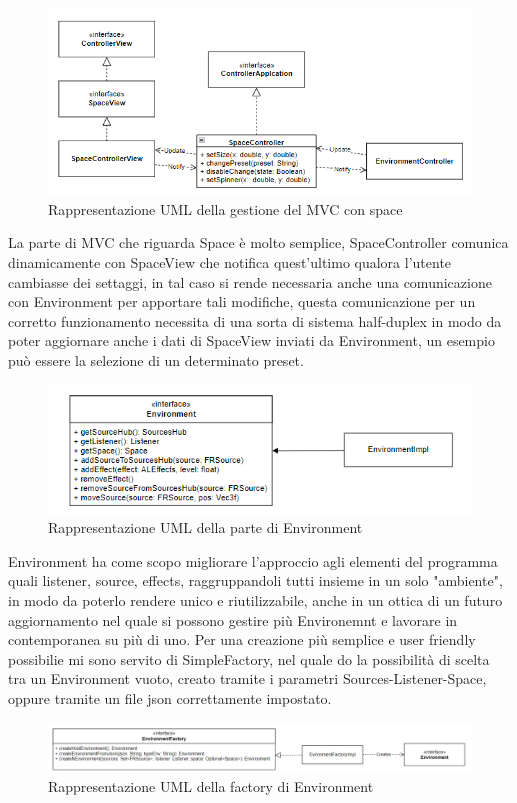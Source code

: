 \documentclass[a4paper,12pt]{report}
\begin{document}
%
\begin{figure}[H]
\centering{}
\includegraphics[width=\textwidth]{img/space/SpaceMVC.png}
\caption{Rappresentazione UML della gestione del MVC con space}
\label{img:spacemvc}
\end{figure}
La parte di MVC che riguarda Space è molto semplice, SpaceController comunica dinamicamente con SpaceView che notifica quest'ultimo qualora l'utente cambiasse dei settaggi, in tal caso si rende necessaria anche una comunicazione con Environment per apportare tali modifiche, questa comunicazione per un corretto funzionamento necessita di una sorta di sistema half-duplex in modo da poter aggiornare anche i dati di SpaceView inviati da Environment, un esempio può essere la selezione di un determinato preset.
%
\begin{figure}[H]
\centering{}
\includegraphics[width=\textwidth]{img/environment/Environment.png}
\caption{Rappresentazione UML della parte di Environment}
\label{img:environment}
\end{figure}
Environment ha come scopo migliorare l'approccio agli elementi del programma quali listener, source, effects, raggruppandoli tutti insieme in un solo "ambiente", in modo da poterlo rendere unico e riutilizzabile, anche in un ottica di un futuro aggiornamento nel quale si possono gestire più Environemnt e lavorare in contemporanea su più di uno.
Per una creazione più semplice e user friendly possibilie mi sono servito di SimpleFactory, nel quale do la possibilità di scelta tra un Environment vuoto, creato tramite i parametri Sources-Listener-Space, oppure tramite un file json correttamente impostato.
%
\begin{figure}[H]
\centering{}
\includegraphics[width=\textwidth]{img/environment/EnvironmentFactory.png}
\caption{Rappresentazione UML della factory di Environment}
\label{img:environmentfactory}
\end{figure}
\end{document}
